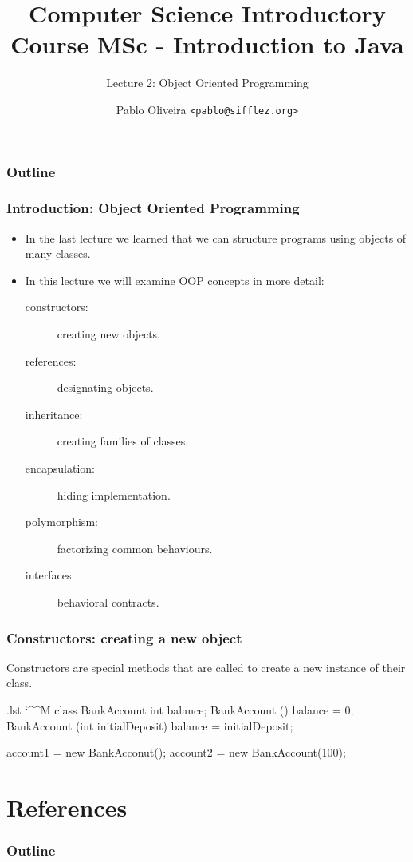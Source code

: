 \documentclass[10pt, handout]{beamer}
\title{Computer Science Introductory Course MSc - Introduction to Java}
\subtitle{Lecture 2: Object Oriented Programming}
\author[Pablo Oliveira]{Pablo Oliveira \texttt{<pablo@sifflez.org>}}
\institute{T\'el\'ecom ParisTech}
\date{}
\makeatletter
\newenvironment{code}{%
  \begingroup
  \@bsphack
  \immediate\openout\lstvrb@out\jobname.lst
  \let\do\@makeother\dospecials\catcode`\^^M\active
  \def\verbatim@processline{%
    \immediate\write\lstvrb@out{\the\verbatim@line}}%
  \verbatim@start}{%
  \immediate\closeout\lstvrb@out
  \@esphack
  \endgroup
  
  \begin{alertblock}{}
    
  \end{alertblock}}
\makeatother
\begin{document}
\begin{frame}
  \titlepage
\end{frame}

\begin{frame}
  \frametitle{Outline}
  \tableofcontents
\end{frame}

\begin{frame}[fragile]
  \frametitle{Introduction: Object Oriented Programming}
  \begin{itemize}
    \item In the last lecture we learned that we can structure programs using 
          objects of many classes.
    \item In this lecture we will examine OOP concepts in more detail:
      \begin{description}
        \item[constructors:] creating new objects. 
        \item[references:] designating objects.
        \item[inheritance:] creating families of classes.
        \item[encapsulation:] hiding implementation.
        \item[polymorphism:] factorizing common behaviours.
        \item[interfaces:] behavioral contracts.
      \end{description}
    \end{itemize}
\end{frame}


\begin{frame}[fragile]
\frametitle{Constructors: creating a new object}

\begin{definition}
  Constructors are special methods that are called to create a new instance of their class.
\end{definition}

\begin{code}
  class BankAccount {
    int balance;
    BankAccount () {
      balance = 0;  
    }
    BankAccount (int initialDeposit){
      balance = initialDeposit;
    }
  }

  account1 = new BankAcconut();
  account2 = new BankAccount(100);
\end{code}
\end{frame}

\section{References}
\begin{frame}
  \frametitle{Outline}
  \tableofcontents[currentsection]
\end{frame}
\end{document}
